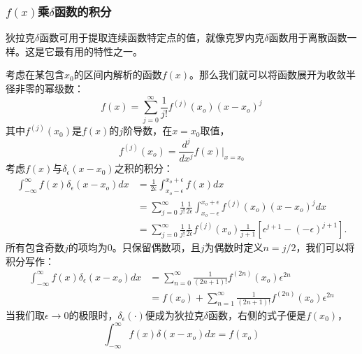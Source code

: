 \documentclass[UTF8]{ctexart}
\numberwithin{equation}{section}%
\numberwithin{figure}{section}%
\begin{document}
    \subsubsection{\texorpdfstring{$f(x)$乘$\delta$函数的积分}{f(x)乘delta函数的积分}}
    狄拉克$\delta$函数可用于提取连续函数特定点的值，就像克罗内克$\delta$函数用于离散函数一样。这是它最有用的特性之一。

    考虑在某包含$x_0$的区间内解析的函数$f(x)$。那么我们就可以将函数展开为收敛半径非零的幂级数：
    \begin{equation}
    f(x)=\sum_{j=0}^{\infty} \frac{1}{j !} f^{(j)}\left(x_{o}\right)\left(x-x_{o}\right)^{j}
    \end{equation}
    其中$f^{(j)}(x_0)$是$f(x)$的$j$阶导数，在$x=x_0$取值，
    \begin{equation}
        f^{(j)}\left(x_{o}\right)=\frac{d^{j}}{d x^{j}} f(x)|_{x=x_{0}}
        \end{equation}
    考虑$f(x)$与$\delta_\epsilon(x-x_0)$之积的积分：
    \begin{equation}
        \begin{aligned}
        \int_{-\infty}^{\infty} f(x) \delta_{\epsilon}\left(x-x_{o}\right) d x &=\frac{1}{2 \epsilon} \int_{x_{o}-\epsilon}^{x_{o}+\epsilon} f(x) d x \\
        &=\sum_{j=0}^{\infty} \frac{1}{j !} \frac{1}{2 \epsilon} \int_{x_{o}-\epsilon}^{x_{o}+\epsilon} f^{(j)}\left(x_{o}\right)\left(x-x_{o}\right)^{j} d x \\
        &=\sum_{j=0}^{\infty} \frac{1}{j !} \frac{1}{2 \epsilon} f^{(j)}\left(x_{o}\right) \frac{1}{j+1}\left[\epsilon^{j+1}-(-\epsilon)^{j+1}\right] .
        \end{aligned}
        \end{equation}
        所有包含奇数$j$的项均为0。只保留偶数项，且$j$为偶数时定义$n=j/2$，我们可以将积分写作：
    \begin{equation}
        \begin{aligned}
        \int_{-\infty}^{\infty} f(x) \delta_{\epsilon}\left(x-x_{o}\right) d x &=\sum_{n=0}^{\infty} \frac{1}{(2 n+1) !} f^{(2 n)}\left(x_{o}\right) \epsilon^{2 n} \\
        &=f\left(x_{o}\right)+\sum_{n=1}^{\infty} \frac{1}{(2 n+1) !} f^{(2 n)}\left(x_{o}\right) \epsilon^{2 n}
        \end{aligned}
        \end{equation}
    当我们取$\epsilon\rightarrow 0$的极限时，$\delta_\epsilon(\cdot)$便成为狄拉克$\delta$函数，右侧的式子便是$f(x_0)$，
    \begin{equation}\label{eq5.30}
        \int_{-\infty}^{\infty} f(x) \delta\left(x-x_{o}\right) d x=f\left(x_{o}\right)
        \end{equation}
    
\end{document}
